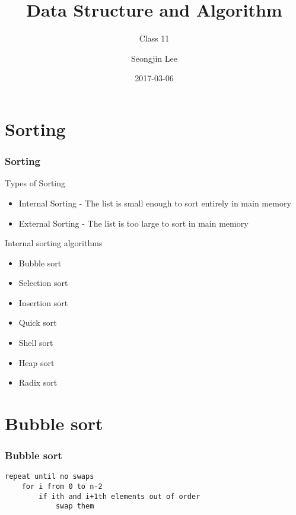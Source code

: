 \documentclass[newPxFont,sthlmFooter,nooffset]{beamer}
\title{Data Structure and Algorithm}
\subtitle{Class 11}
\author[SJL]{Seongjin Lee}
\institute{\href{mailto:insight@gnu.ac.kr}{insight@gnu.ac.kr}\\\url{http://resourceful.github.io}\\Systems Research Lab.\\GNU}
\date{2017-03-06}
\begin{document}
\lstset{basicstyle=\normalsize\ttfamily, language=C}

\frame[plain,t]{\titlepage} 




\section{Sorting}

\begin{frame}[t]
  \frametitle{Sorting}
Types of Sorting
\begin{itemize}
\item Internal Sorting - The list is small enough to sort entirely in main memory
\item External Sorting - The list is too large to sort in main memory
\end{itemize}

Internal sorting algorithms

\begin{itemize}
\item Bubble sort
\item Selection sort
\item Insertion sort
\item Quick sort
\item Shell sort
\item Heap sort
\item Radix sort
\end{itemize}
\end{frame}

\section{Bubble sort}


\begin{frame}[t, fragile]
  \frametitle{Bubble sort}
  \begin{lstlisting}
repeat until no swaps
    for i from 0 to n-2
        if ith and i+1th elements out of order
            swap them
  \end{lstlisting}
\end{frame}
\end{document}
